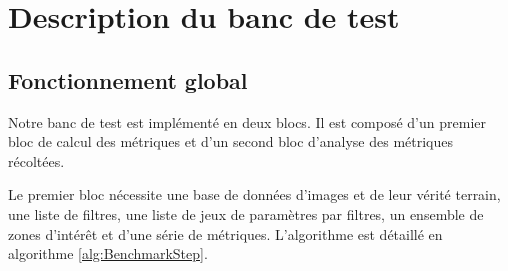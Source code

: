 \begin{table}
  \begin{center}
  \end{center}
  \caption{Récapitulatif des paramètres des bases de données utilisés pour chaque version de nos expériences. Chaque version a donné lieu à une publication dont le contexte est fourni dans le chapitre \chapReproN{}.}
  \label{Tab:recap_versions}
\end{table}
\section{Description du banc de test}
\subsection{Fonctionnement global}
Notre banc de test est implémenté en deux blocs. Il est composé d'un premier bloc de calcul des métriques et d'un second bloc d'analyse des métriques récoltées.

Le premier bloc nécessite une base de données d'images et de leur vérité terrain, une liste de filtres, une liste de jeux de paramètres par filtres, un ensemble de zones d'intérêt et d'une série de métriques. L'algorithme est détaillé en algorithme \ref{alg:BenchmarkStep}.

